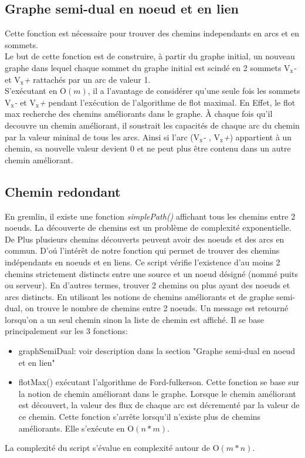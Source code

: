 \documentclass[onecolumn, 12pt]{article}
\begin{document}
\subsection{Graphe semi-dual en noeud et en lien}
Cette fonction est n\'ecessaire pour trouver  des chemins independants en arcs et en sommets. \\
Le but de cette fonction est de construire, \`a partir du graphe initial, un nouveau graphe dans lequel chaque sommet du graphe initial est scind\'e en 2 sommets  \emph {$\textrm{V}_\textrm{x}$-} et  \emph {$\textrm{V}_\textrm{x}$+}  rattach\'es par un arc de valeur 1. \\
S'ex\'ecutant en  $\mathrm{O}{(m)}$, il a l'avantage de consid\'erer qu'une seule fois les sommets \emph {$\textrm{V}_\textrm{x}$-} et  \emph {$\textrm{V}_\textrm{x}$+} pendant l'ex\'ecution de l'algorithme de flot maximal. En Effet, le flot max recherche des chemins am\'eliorants dans le graphe. \`A chaque fois qu'il decouvre un chemin am\'eliorant, il soustrait les capacit\'es de chaque arc du chemin par la valeur mininal de tous les arcs. Ainsi si l'arc (\emph {$\textrm{V}_\textrm{x}$-} , \emph {$\textrm{V}_\textrm{x}$+}) appartient \`a un chemin, sa nouvelle valeur devient 0 et ne peut plus \^etre contenu dans un autre chemin am\'eliorant.

\subsection{Chemin redondant}
En gremlin, il existe une fonction \emph{simplePath()} affichant tous les chemins entre 2 noeuds. La d\'ecouverte de chemins est un probl\`eme de complexit\'e exponentielle. De Plus plusieurs chemins d\'ecouverts peuvent avoir des noeuds et des arcs en commun. D'o\'u l'int\'er\^et de notre fonction qui permet de trouver des chemins ind\'ependants en noeuds et en liens.
Ce script  v\'erifie l'existence d'au moins 2 chemins  strictement distincts entre une source et un noeud d\'esign\'e (nomm\'e puits ou serveur). En d'autres termes, trouver 2 chemins ou plus ayant des noeuds et arcs distincts. En utilisant les notions de chemins am\'eliorants et de graphe semi-dual, on trouve le nombre de chemins entre 2 noeuds. Un message est retourn\'e lorsqu'on a un seul chemin sinon la liste de chemin est affich\'e. Il se base principalement sur les 3 fonctions:
\begin{itemize}
\item graphSemiDual: voir description dans la section "Graphe semi-dual en noeud et en lien"
\item flotMax() ex\'ecutant l'algorithme de Ford-fulkerson. Cette fonction se base sur la notion de chemin am\'eliorant dans le graphe. Lorsque le chemin am\'eliorant est d\'ecouvert, la valeur des flux de chaque arc est d\'ecrement\'e par la valeur de ce chemin. Cette fonction s'arr\^ete lorsqu'il n'existe plus de chemins am\'eliorants. Elle s'ex\'ecute en  $\mathrm{O}{(n*m)}$.
\end{itemize}
La complexit\'e du script  s'\'evalue en complexit\'e autour de  $\mathrm{O}{(m*n)}$.
\end{document}
